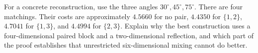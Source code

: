 \documentclass[11pt]{article}
\numberwithin{equation}{section}
\begin{document}
For a concrete reconstruction, use the three angles $30^\circ,45^\circ,75^\circ$.
There are four matchings. Their costs are approximately $4.5660$ for no
pair, $4.4350$ for $\{1,2\}$, $4.7041$ for $\{1,3\}$, and $4.4994$ for
$\{2,3\}$. Explain why the best construction uses a four-dimensional
paired block and a two-dimensional reflection, and which part of the proof
establishes that unrestricted six-dimensional mixing cannot do better.
\end{document}
